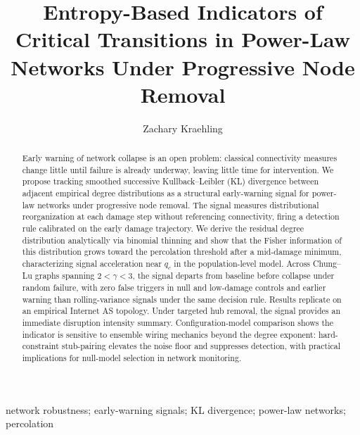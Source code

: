 \documentclass{nws}
\newif\ifblind
\begin{document}
\ifblind
  \lefttitle{[Author]}
\else
\fi
{}



\title{Entropy-Based Indicators of Critical Transitions in
Power-Law Networks Under Progressive Node Removal}

\ifblind
\author{[Author]}
\else
\author{Zachary Kraehling}

\fi

\begin{abstract}
Early warning of network collapse is an open problem: classical connectivity measures change little until failure is already underway, leaving little time for intervention. We propose tracking smoothed successive Kullback--Leibler (KL) divergence between adjacent empirical degree distributions as a structural early-warning signal for power-law networks under progressive node removal. The signal measures distributional reorganization at each damage step without referencing connectivity, firing a detection rule calibrated on the early damage trajectory. We derive the residual degree distribution analytically via binomial thinning and show that the Fisher information of this distribution grows toward the percolation threshold after a mid-damage minimum, characterizing signal acceleration near $q_c$ in the population-level model. Across Chung--Lu graphs spanning $2 < \gamma < 3$, the signal departs from baseline before collapse under random failure, with zero false triggers in null and low-damage controls and earlier warning than rolling-variance signals under the same decision rule. Results replicate on an empirical Internet AS topology. Under targeted hub removal, the signal provides an immediate disruption intensity summary. Configuration-model comparison shows the indicator is sensitive to ensemble wiring mechanics beyond the degree exponent: hard-constraint stub-pairing elevates the noise floor and suppresses detection, with practical implications for null-model selection in network monitoring.
\end{abstract}

\begin{keywords}
network robustness; early-warning signals; KL divergence; power-law networks; percolation
\end{keywords}
\end{document}

